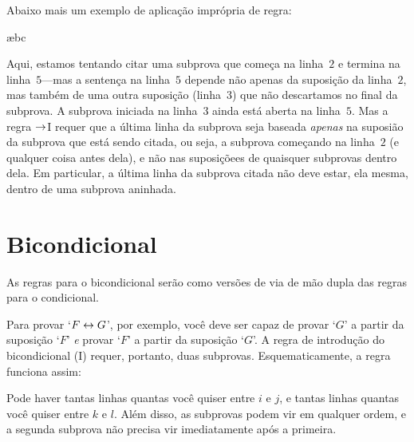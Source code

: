 Abaixo mais um exemplo de aplicação imprópria de regra:
\begin{fitchproof}
\open
	\open
	\ae{bc}
	\close
\close
{}
 
\end{fitchproof}
Aqui, estamos tentando citar uma subprova que começa na linha~$2$ e termina na linha~$5$---mas a sentença na linha~$5$ depende não apenas da suposição da linha~$2$, mas também de uma outra suposição (linha~$3$) que não descartamos no final da subprova.  A subprova iniciada na linha~$3$ ainda está aberta na linha~$5$.  Mas a regra $\rightarrow$I requer que a última linha da subprova seja baseada \emph{apenas} na suposião da subprova  que está sendo citada, ou seja, a subprova começando na linha~$2$ (e qualquer coisa antes dela), e não nas suposiçõees de quaisquer subprovas dentro dela. Em particular, a última linha da subprova citada não deve estar, ela mesma, dentro de uma subprova
aninhada.




\section{Bicondicional}
As regras para o bicondicional serão como versões de via de mão dupla das regras para o condicional. 

Para provar `$F \leftrightarrow G$',  por exemplo, você deve ser capaz de provar `$G$' a partir da  suposição `$F$' \emph{e}  provar `$F$' a partir da suposição `$G$'. A regra de introdução do bicondicional ({\eiff}I) requer, portanto, duas subprovas.  Esquematicamente, a regra funciona assim: 

 

Pode haver tantas linhas quantas você quiser entre $i$ e $j$, e tantas linhas quantas você quiser entre $k$ e $l$.  Além disso, as subprovas podem vir em qualquer ordem, e a segunda subprova não precisa vir imediatamente após a primeira.

